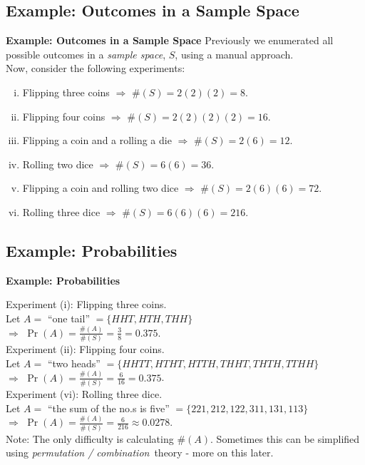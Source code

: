 \documentclass[compress]{beamer}        %
\makeatletter
\newcommand{\tcb}{\textcolor{beamer@blendedblue}}
\makeatother
\begin{document}
\subsection{Example: Outcomes in a Sample Space}
\begin{frame}{\bf \tcb{Example: Outcomes in a Sample Space}}
Previously we enumerated all possible outcomes in a \emph{sample space}, $S$, using a manual approach.\\[0.4cm]

Now, consider the following experiments:\\[0.2cm]
\begin{enumerate}[i)]\itemsep0.3cm
\item Flipping three coins $\Rightarrow$ $\#(S) = 2 (2)(2) = 8$.
\item Flipping four coins $\Rightarrow$ $\#(S) = 2(2)(2)(2) = 16$.
\item Flipping a coin and a rolling a die $\Rightarrow$ $\#(S) = 2 (6) = 12$.
\item Rolling two dice $\Rightarrow$ $\#(S) = 6(6) = 36$.
\item Flipping a coin and rolling two dice $\Rightarrow$ $\#(S) = 2(6)(6) = 72$.
\item Rolling three dice $\Rightarrow$ $\#(S) = 6(6)(6) = 216$.
\end{enumerate}

\end{frame}


\subsection{Example: Probabilities}
\begin{frame}{\bf \tcb{Example: Probabilities}}\label{probslide}

Experiment (i): Flipping three coins.\\[0.1cm]
Let $A =$ ``one tail'' $= \{HHT, HTH, THH\}$\\[0.1cm]
$\Rightarrow$ $\Pr(A) = \frac{\#(A)}{\#(S)} = \frac{3}{8} = 0.375$.\\[0.4cm]

Experiment (ii): Flipping four coins.\\[0.1cm]
Let $A =$ ``two heads'' $= \{HHTT, HTHT, HTTH, THHT, THTH, TTHH\}$\\[0.1cm]
$\Rightarrow$ $\Pr(A) = \frac{\#(A)}{\#(S)} = \frac{6}{16} = 0.375$.\\[0.4cm]


Experiment (vi): Rolling three dice.\\[0.1cm]
Let $A =$ ``the sum of the no.s is five'' $= \{221, 212, 122,311,131,113\}$\\[0.1cm]
$\Rightarrow$ $\Pr(A) = \frac{\#(A)}{\#(S)} = \frac{6}{216} \approx 0.0278$.\\[0.4cm]

{\footnotesize Note: The only difficulty is calculating $\#(A)$. Sometimes this can be simplified using \emph{permutation / combination} \,theory - more on this later.}
\end{frame}
\end{document}
